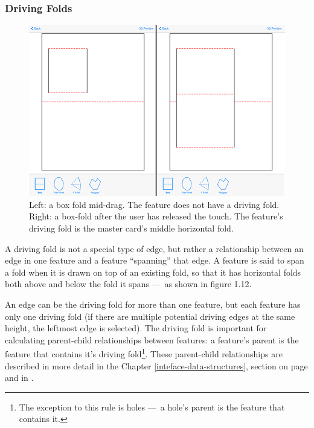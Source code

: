 \subsubsection{Driving Folds}\label{driving-folds}

\begin{figure}[htbp]
\centering
\includegraphics{figures/33_UI_Interface_Data_Structures/boxfold_driving_non_driving.png}
\caption{Left: a box fold mid-drag. The feature does not have a driving
fold. Right: a box-fold after the user has released the touch. The
feature's driving fold is the master card's middle horizontal fold.}
\end{figure}

A driving fold is not a special type of edge, but rather a relationship
between an edge in one feature and a feature ``spanning'' that edge. A
feature is said to span a fold when it is drawn on top of an existing
fold, so that it has horizontal folds both above and below the fold it
spans ---~as shown in figure 1.12.

An edge can be the driving fold for more than one feature, but each
feature has only one driving fold (if there are multiple potential
driving edges at the same height, the leftmost edge is selected). The
driving fold is important for calculating parent-child relationships
between features: a feature's parent is the feature that contains it's
driving fold\footnote{The exception to this rule is holes ---~a hole's
  parent is the feature that contains it.}. These parent-child
relationships are described in more detail in the Chapter
\ref{inteface-data-structures}, section  on page
\pageref{hierarchy} and in \citet{mallen}.

